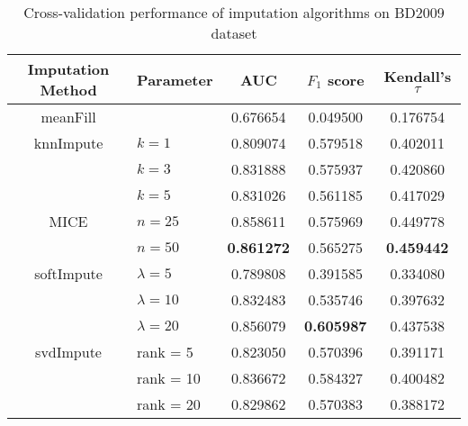 \begin{table}[htbp]
\centering
\begin{tabular}{cl||ccc}
\toprule
Imputation Method & Parameter & AUC & $F_1$ score & Kendall's $\tau$ \\
\midrule 
meanFill & &   0.676654 &  0.049500 &  0.176754 \\
\midrule
knnImpute & $k = 1$ &  0.809074 &  0.579518 &  0.402011 \\
  & $k = 3$  &  0.831888 &  0.575937 &  0.420860 \\
  & $k = 5$ &  0.831026 &  0.561185 &  0.417029 \\
\midrule
MICE & $n = 25$  &  0.858611 &  0.575969 &  0.449778 \\
     & $n = 50$  &  {\bf 0.861272} &  0.565275 &  {\bf 0.459442} \\
\midrule
softImpute & $\lambda=5$ &  0.789808 &  0.391585 &  0.334080 \\
& $\lambda=10$ &  0.832483 &  0.535746 &  0.397632 \\
& $\lambda=20$ &  0.856079 &  {\bf 0.605987} &  0.437538 \\
             
\midrule
svdImpute & rank = 5  &  0.823050 &  0.570396 &  0.391171 \\
& rank = 10  &  0.836672 &  0.584327 &  0.400482 \\
& rank = 20  &  0.829862 &  0.570383 &  0.388172 \\
\bottomrule[1.25pt]
\end{tabular}
\begin{center}
\caption{Cross-validation performance of imputation algorithms on BD2009 dataset} \label{tab:imputation}
\end{center}
\end{table}

